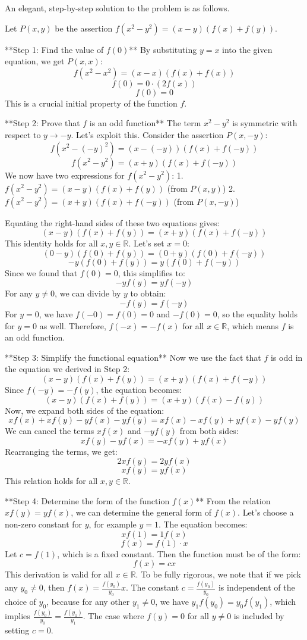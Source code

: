 An elegant, step-by-step solution to the problem is as follows.

Let $P(x, y)$ be the assertion $f(x^2 - y^2) = (x-y)(f(x) + f(y))$.

**Step 1: Find the value of $f(0)$**
By substituting $y=x$ into the given equation, we get $P(x, x)$:
$$f(x^2 - x^2) = (x-x)(f(x) + f(x))$$
$$f(0) = 0 \cdot (2f(x))$$
$$f(0) = 0$$
This is a crucial initial property of the function $f$.

**Step 2: Prove that $f$ is an odd function**
The term $x^2 - y^2$ is symmetric with respect to $y \to -y$. Let's exploit this.
Consider the assertion $P(x, -y)$:
$$f(x^2 - (-y)^2) = (x - (-y))(f(x) + f(-y))$$
$$f(x^2 - y^2) = (x+y)(f(x) + f(-y))$$
We now have two expressions for $f(x^2 - y^2)$:
1. $f(x^2 - y^2) = (x-y)(f(x) + f(y))$ (from $P(x,y)$)
2. $f(x^2 - y^2) = (x+y)(f(x) + f(-y))$ (from $P(x,-y)$)

Equating the right-hand sides of these two equations gives:
$$(x-y)(f(x) + f(y)) = (x+y)(f(x) + f(-y))$$
This identity holds for all $x, y \in \mathbb{R}$. Let's set $x=0$:
$$(0-y)(f(0) + f(y)) = (0+y)(f(0) + f(-y))$$
$$-y(f(0) + f(y)) = y(f(0) + f(-y))$$
Since we found that $f(0)=0$, this simplifies to:
$$-y f(y) = y f(-y)$$
For any $y \neq 0$, we can divide by $y$ to obtain:
$$-f(y) = f(-y)$$
For $y=0$, we have $f(-0) = f(0) = 0$ and $-f(0) = 0$, so the equality holds for $y=0$ as well.
Therefore, $f(-x) = -f(x)$ for all $x \in \mathbb{R}$, which means $f$ is an odd function.

**Step 3: Simplify the functional equation**
Now we use the fact that $f$ is odd in the equation we derived in Step 2:
$$(x-y)(f(x) + f(y)) = (x+y)(f(x) + f(-y))$$
Since $f(-y) = -f(y)$, the equation becomes:
$$(x-y)(f(x) + f(y)) = (x+y)(f(x) - f(y))$$
Now, we expand both sides of the equation:
$$xf(x) + xf(y) - yf(x) - yf(y) = xf(x) - xf(y) + yf(x) - yf(y)$$
We can cancel the terms $xf(x)$ and $-yf(y)$ from both sides:
$$xf(y) - yf(x) = -xf(y) + yf(x)$$
Rearranging the terms, we get:
$$2xf(y) = 2yf(x)$$
$$xf(y) = yf(x)$$
This relation holds for all $x, y \in \mathbb{R}$.

**Step 4: Determine the form of the function $f(x)$**
From the relation $xf(y) = yf(x)$, we can determine the general form of $f(x)$.
Let's choose a non-zero constant for $y$, for example $y=1$. The equation becomes:
$$x f(1) = 1 f(x)$$
$$f(x) = f(1) \cdot x$$
Let $c = f(1)$, which is a fixed constant. Then the function must be of the form:
$$f(x) = cx$$
This derivation is valid for all $x \in \mathbb{R}$. To be fully rigorous, we note that if we pick any $y_0 \neq 0$, then $f(x) = \frac{f(y_0)}{y_0}x$. The constant $c = \frac{f(y_0)}{y_0}$ is independent of the choice of $y_0$, because for any other $y_1 \neq 0$, we have $y_1 f(y_0) = y_0 f(y_1)$, which implies $\frac{f(y_0)}{y_0} = \frac{f(y_1)}{y_1}$. The case where $f(y)=0$ for all $y \neq 0$ is included by setting $c=0$.

